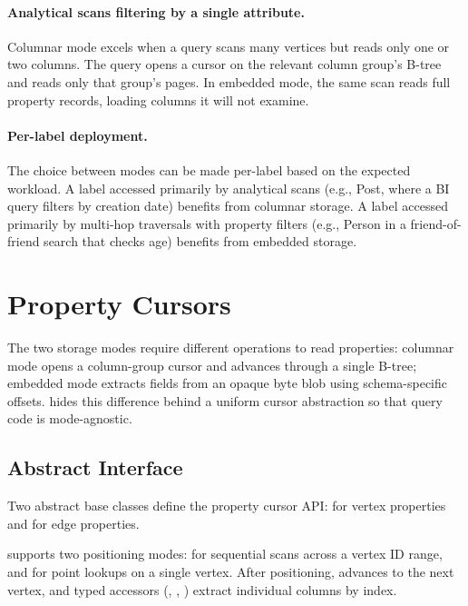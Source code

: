 \paragraph{Analytical scans filtering by a single attribute.}
Columnar mode excels when a query scans many vertices but reads only one or two columns.
The query opens a cursor on the relevant column group's B-tree and reads only that group's pages.
In embedded mode, the same scan reads full property records, loading columns it will not examine.

\paragraph{Per-label deployment.}
The choice between modes can be made per-label based on the expected workload.
A label accessed primarily by analytical scans (e.g., Post, where a BI query filters by creation date) benefits from columnar storage.
A label accessed primarily by multi-hop traversals with property filters (e.g., Person in a friend-of-friend search that checks age) benefits from embedded storage.

\section{Property Cursors}
\label{arch:prop-cursors}

The two storage modes require different \wt{} operations to read properties: columnar mode opens a column-group cursor and advances through a single B-tree; embedded mode extracts fields from an opaque byte blob using schema-specific offsets.
\project{} hides this difference behind a uniform cursor abstraction so that query code is mode-agnostic.

\subsection{Abstract Interface}
\label{arch:prop-cursors:interface}

Two abstract base classes define the property cursor \ac{API}:  for vertex properties and  for edge properties.

 supports two positioning modes:  for sequential scans across a vertex ID range, and  for point lookups on a single vertex.
After positioning,  advances to the next vertex, and typed accessors (, , ) extract individual columns by index.

